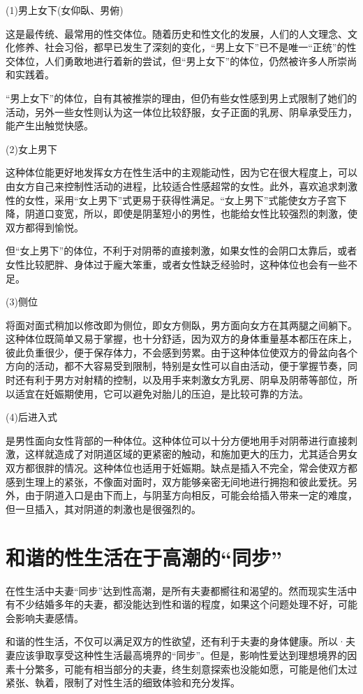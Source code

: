 \documentclass[12pt,UTF8]{ctexbook}
\begin{document}
(1)男上女下(女仰臥、男俯)

这是最传统、最常用的性交体位。随着历史和性文化的发展，人们的人文理念、文化修养、社会习俗，都早已发生了深刻的变化，“男上女下”已不是唯一“正统”的性交体位，人们勇敢地进行着新的尝试，但“男上女下”的体位，仍然被许多人所崇尚和实践着。

“男上女下”的体位，自有其被推崇的理由，但仍有些女性感到男上式限制了她们的活动，另外一些女性则认为这一体位比较舒服，女子正面的乳房、阴阜承受压力，能产生出触觉快感。

(2)女上男下

这种体位能更好地发挥女方在性生活中的主观能动性，因为它在很大程度上，可以由女方自己来控制性活动的进程，比较适合性感超常的女性。此外，喜欢追求刺激性的女性，采用“女上男下”式更易于获得性满足。“女上男下”式能使女方子宫下降，阴道口变宽，所以，即使是阴茎短小的男性，也能给女性比较强烈的刺激，使双方都得到愉悦。

但“女上男下”的体位，不利于对阴蒂的直接刺激，如果女性的会阴口太靠后，或者女性比较肥胖、身体过于龐大笨重，或者女性缺乏经验时，这种体位也会有一些不足。

(3)侧位

将面对面式稍加以修改即为侧位，即女方侧臥，男方面向女方在其两腿之间躺下。这种体位既简单又易于掌握，也十分舒适，因为双方的身体重量基本都压在床上，彼此负重很少，便于保存体力，不会感到劳累。由于这种体位使双方的骨盆向各个方向的活动，都不大容易受到限制，特别是女性可以自由活动，便于掌握节奏，同时还有利于男方对射精的控制，以及用手来刺激女方乳房、阴阜及阴蒂等部位，所以适宜在妊娠期使用，它可以避免对胎儿的压迫，是比较可靠的方法。

(4)后进入式

是男性面向女性背部的一种体位。这种体位可以十分方便地用手对阴蒂进行直接刺激，这样就造成了对阴道区域的更紧密的触动，和施加更大的压力，尤其适合男女双方都很胖的情况。这种体位也适用于妊娠期。缺点是插入不完全，常会使双方都感到生理上的紧张，不像面对面时，双方能够亲密无间地进行拥抱和彼此爱抚。另外，由于阴道入口是由下而上，与阴茎方向相反，可能会给插入带来一定的难度，但一旦插入，其对阴道的刺激也是很强烈的。

\section{和谐的性生活在于高潮的“同步”}

在性生活中夫妻“同步”达到性高潮，是所有夫妻都嚮往和渴望的。然而现实生活中有不少结婚多年的夫妻，都没能达到性和谐的程度，如果这个问题处理不好，可能会影响夫妻感情。

和谐的性生活，不仅可以满足双方的性欲望，还有利于夫妻的身体健康。所以·夫妻应该爭取享受这种性生活最高境界的“同步”。但是，影响性爱达到理想境界的因素十分繁多，可能有相当部分的夫妻，终生刻意探索也没能如愿，可能是他们太过紧张、執着，限制了对性生活的细致体验和充分发挥。
\end{document}
